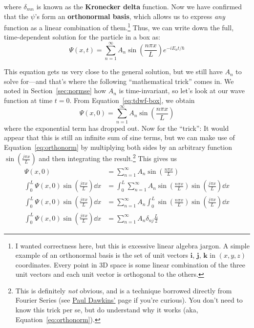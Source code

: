 where $\delta_{mn}$ is known as the \textbf{Kronecker delta} function. Now we have confirmed that the $\psi$'s form an \textbf{orthonormal basis}, which allows us to express \emph{any} function as a linear combination of them.\footnote{I wanted correctness here, but this is excessive linear algebra jargon. A simple example of an orthonormal basis is the set of unit vectors $\mathbf{i}$, $\mathbf{j}$, $\mathbf{k}$ in $(x,y,z)$ coordinates. Every point in 3D space is some linear combination of the three unit vectors and each unit vector is orthogonal to the others.} Thus, we can write down the full, time-dependent solution for the particle in a box as:
\begin{equation}
	\Psi(x,t) = \sum_{n=1}^{\infty} A_n \sin \left(\frac{n\pi x}{L}\right) e^{-iE_nt/\hbar} \label{eq:tdwf-box}
\end{equation}

This equation gets us very close to the general solution, but we still have $A_n$ to solve for---and that's where the following ``mathematical trick'' comes in. We noted in Section~\ref{sec:normse} how $A_n$ is time-invariant, so let's look at our wave function at time $t=0$. From Equation~\ref{eq:tdwf-box}, we obtain
\begin{equation*}
	\Psi(x,0) = \sum_{n=1}^{\infty} A_n \sin \left(\frac{n\pi x}{L} \right)
\end{equation*}
where the exponential term has dropped out. Now for the ``trick'': It would appear that this is still an infinite sum of sine terms, but we can make use of Equation~\ref{eq:orthonorm} by multiplying both sides by an arbitrary function $\sin \left(\frac{j\pi x}{L}\right)$ and then integrating the result.\footnote{This is definitely \emph{not} obvious, and is a technique borrowed directly from Fourier Series (see \href{http://tutorial.math.lamar.edu/Classes/DE/FourierSeries.aspx}{Paul Dawkins'} page if you're curious). You don't need to know this trick per se, but do understand why it works (aka, Equation~\ref{eq:orthonorm}).} This gives us
\begin{align*}
	\Psi(x,0) &= \sum_{n=1}^{\infty} A_n \sin \left(\frac{n\pi x}{L} \right) \\
	\int_0^L \Psi(x,0) \sin \left(\frac{j \pi x}{L}\right) \dd{x} &= \int_0^L \sum_{n=1}^{\infty} A_n \sin \left(\frac{n\pi x}{L} \right) \sin \left( \frac{j \pi x}{L}\right) \dd{x} \\
	\int_0^L \Psi(x,0) \sin \left(\frac{j \pi x}{L}\right) \dd{x} &= \sum_{n=1}^{\infty} A_n \int_0^L \sin \left(\frac{n\pi x}{L} \right) \sin \left( \frac{j \pi x}{L}\right) \dd{x} \\
	\int_0^L \Psi(x,0) \sin \left(\frac{j \pi x}{L}\right) \dd{x} &= \sum_{n=1}^{\infty} A_n \delta_{nj} \frac{L}{2}
\end{align*}

